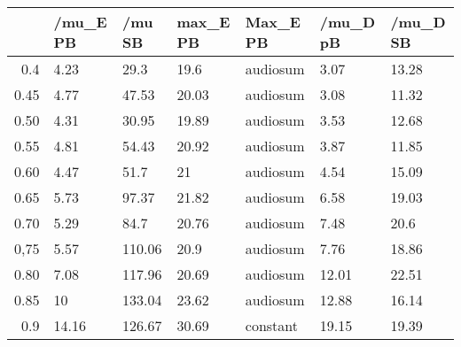 \begin{table}[ht]
\centering
\begin{tabular}{rllllll}
  \hline
 & /mu\_E PB & /mu SB & max\_E PB & Max\_E PB & /mu\_D pB & /mu\_D SB \\ 
  \hline
0.4 & 4.23 & 29.3 & 19.6 & audiosum & 3.07 & 13.28 \\ 
  0.45 & 4.77 & 47.53 & 20.03 & audiosum & 3.08 & 11.32 \\ 
  0.50 & 4.31 & 30.95 & 19.89 & audiosum & 3.53 & 12.68 \\ 
  0.55 & 4.81 & 54.43 & 20.92 & audiosum & 3.87 & 11.85 \\ 
  0.60 & 4.47 & 51.7 & 21 & audiosum & 4.54 & 15.09 \\ 
  0.65 & 5.73 & 97.37 & 21.82 & audiosum & 6.58 & 19.03 \\ 
  0.70 & 5.29 & 84.7 & 20.76 & audiosum & 7.48 & 20.6 \\ 
  0,75 & 5.57 & 110.06 & 20.9 & audiosum & 7.76 & 18.86 \\ 
  0.80 & 7.08 & 117.96 & 20.69 & audiosum & 12.01 & 22.51 \\ 
  0.85 & 10 & 133.04 & 23.62 & audiosum & 12.88 & 16.14 \\ 
  0.9 & 14.16 & 126.67 & 30.69 & constant & 19.15 & 19.39 \\ 
   \hline
\end{tabular}
\end{table}

